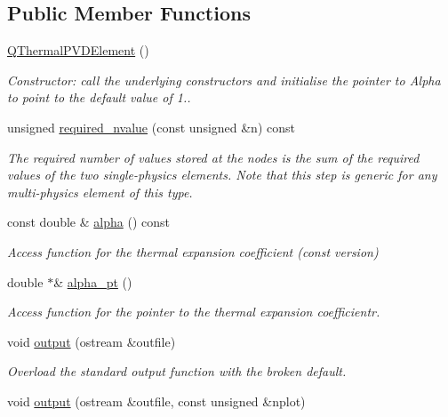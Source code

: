 \subsection*{Public Member Functions}
\begin{DoxyCompactItemize}
\item 
\hyperlink{classQThermalPVDElement_a24d60d6461b169603388f263cbdccd75}{Q\+Thermal\+P\+V\+D\+Element} ()
\begin{DoxyCompactList}\small\item\em Constructor\+: call the underlying constructors and initialise the pointer to Alpha to point to the default value of 1.. \end{DoxyCompactList}\item 
unsigned \hyperlink{classQThermalPVDElement_a55025994fc3d2799fde6f9c1142340af}{required\+\_\+nvalue} (const unsigned \&n) const
\begin{DoxyCompactList}\small\item\em The required number of values stored at the nodes is the sum of the required values of the two single-\/physics elements. Note that this step is generic for any multi-\/physics element of this type. \end{DoxyCompactList}\item 
const double \& \hyperlink{classQThermalPVDElement_a59b86e75dc7b6f99a84ef17fef8d949d}{alpha} () const
\begin{DoxyCompactList}\small\item\em Access function for the thermal expansion coefficient (const version) \end{DoxyCompactList}\item 
double $\ast$\& \hyperlink{classQThermalPVDElement_a57fb80dd582c02c0e8c7dc17491bf76f}{alpha\+\_\+pt} ()
\begin{DoxyCompactList}\small\item\em Access function for the pointer to the thermal expansion coefficientr. \end{DoxyCompactList}\item 
void \hyperlink{classQThermalPVDElement_a99e482f47a98c1b5ec7ec069211de827}{output} (ostream \&outfile)
\begin{DoxyCompactList}\small\item\em Overload the standard output function with the broken default. \end{DoxyCompactList}\item 
void \hyperlink{classQThermalPVDElement_a9d00cc21789124a37dffc9fdf2f011cd}{output} (ostream \&outfile, const unsigned \&nplot)

\end{DoxyCompactItemize}
